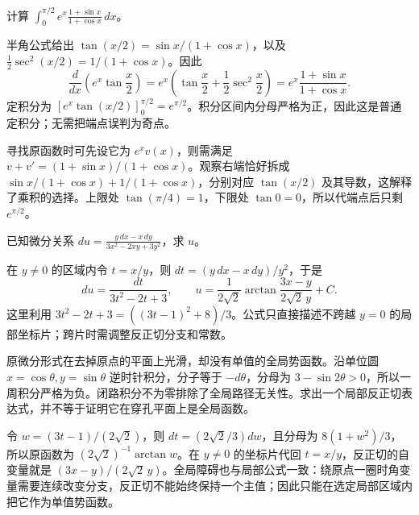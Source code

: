 \documentclass[UTF8,12pt,a4paper,fontset=fandol]{ctexart}
\begin{document}
\begin{example}\label{nm-2019-1c}
计算 $\displaystyle\int_0^{\pi/2}e^x\frac{1+\sin x}{1+\cos x}\,dx$。
\end{example}
\begin{solve}
半角公式给出 $\tan(x/2)=\sin x/(1+\cos x)$，以及 $\frac12\sec^2(x/2)=1/(1+\cos x)$。因此
\[
 \frac{d}{dx}\left(e^x\tan\frac x2\right)
 =e^x\left(\tan\frac x2+\frac12\sec^2\frac x2\right)
 =e^x\frac{1+\sin x}{1+\cos x}.
\]
定积分为 $[e^x\tan(x/2)]_0^{\pi/2}=e^{\pi/2}$。积分区间内分母严格为正，因此这是普通定积分；无需把端点误判为奇点。

寻找原函数时可先设它为 $e^xv(x)$，则需满足 $v+v'=(1+\sin x)/(1+\cos x)$。观察右端恰好拆成 $\sin x/(1+\cos x)+1/(1+\cos x)$，分别对应 $\tan(x/2)$ 及其导数，这解释了乘积的选择。上限处 $\tan(\pi/4)=1$，下限处 $\tan0=0$，所以代端点后只剩 $e^{\pi/2}$。

\end{solve}

\begin{example}\label{nm-2019-1d}
已知微分关系 $\displaystyle du=\frac{y\,dx-x\,dy}{3x^2-2xy+3y^2}$，求 $u$。
\end{example}
\begin{solve}
在 $y\ne0$ 的区域内令 $t=x/y$，则 $dt=(y\,dx-x\,dy)/y^2$，于是
\[
 du=\frac{dt}{3t^2-2t+3},\qquad
 u=\frac1{2\sqrt2}\arctan\frac{3x-y}{2\sqrt2\,y}+C.
\]
这里利用 $3t^2-2t+3=((3t-1)^2+8)/3$。公式只直接描述不跨越 $y=0$ 的局部坐标片；跨片时需调整反正切分支和常数。

原微分形式在去掉原点的平面上光滑，却没有单值的全局势函数。沿单位圆 $x=\cos\theta,y=\sin\theta$ 逆时针积分，分子等于 $-d\theta$，分母为 $3-\sin2\theta>0$，所以一周积分严格为负。闭路积分不为零排除了全局路径无关性。求出一个局部反正切表达式，并不等于证明它在穿孔平面上是全局函数。

令 $w=(3t-1)/(2\sqrt2)$，则 $dt=(2\sqrt2/3)dw$，且分母为 $8(1+w^2)/3$，所以原函数为 $(2\sqrt2)^{-1}\arctan w$。在 $y\ne0$ 的坐标片代回 $t=x/y$，反正切的自变量就是 $(3x-y)/(2\sqrt2\,y)$。全局障碍也与局部公式一致：绕原点一圈时角变量需要连续改变分支，反正切不能始终保持一个主值；因此只能在选定局部区域内把它作为单值势函数。

\end{solve}
\end{document}
